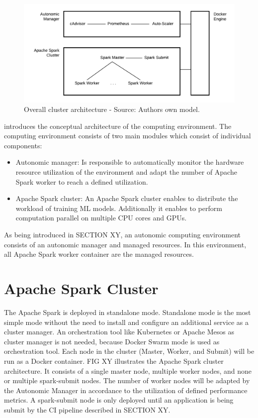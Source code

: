 \begin{figure}[h]
\centering
\includegraphics[scale=0.8]{images/05_conceptual_design/cluster_architecture/overall_architecture}
\caption{Overall cluster architecture - Source: Authors own model.}
\label{fig:05_environment_concept}
\end{figure}
 introduces the conceptual architecture of the computing environment.
The computing environment consists of two main modules which consist of individual components:
\begin{itemize}
\item Autonomic manager: Is responsible to automatically monitor the hardware resource utilization of the environment and adapt the number of Apache Spark worker to reach a defined utilization.
\item Apache Spark cluster: An Apache Spark cluster enables to distribute the workload of training ML models. Additionally it enables to perform computation parallel on multiple CPU cores and GPUs.
\end{itemize}
As being introduced in SECTION XY, an autonomic computing environment consists of an autonomic manager and managed resources.
In this environment, all Apache Spark worker container are the managed resources.


\section{Apache Spark Cluster}
\label{sec:05_spark}

The Apache Spark is deployed in standalone mode. Standalone mode is the most simple mode without the need to install and configure an additional service as a cluster manager. An orchestration tool like Kubernetes or Apache Mesos as cluster manager is not needed, because Docker Swarm mode is used as orchestration tool.
Each node in the cluster (Master, Worker, and Submit) will be run as a Docker container.
FIG XY illustrates the Apache Spark cluster architecture. It consists of a single master node, multiple worker nodes, and none or multiple spark-submit nodes.
The number of worker nodes will be adapted by the Autonomic Manager in accordance to the utilization of defined performance metrics.
A spark-submit node is only deployed until an application is being submit by the CI pipeline described in SECTION XY.


